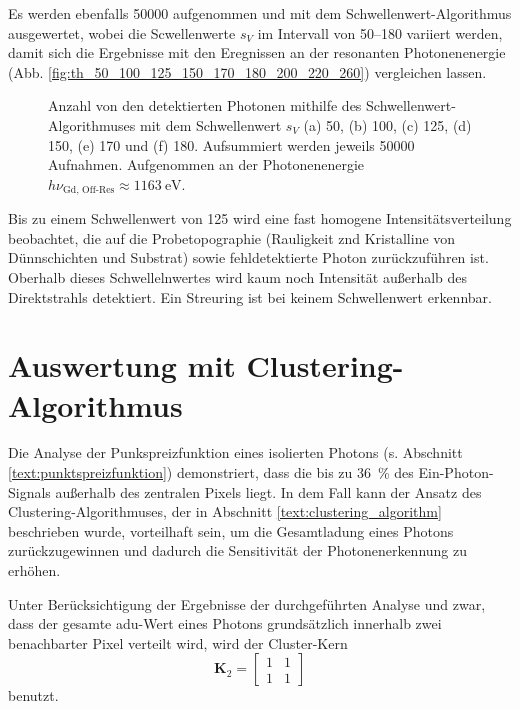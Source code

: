 \noindent
Es werden ebenfalls \SI{50000}{\captures} aufgenommen und mit dem Schwellenwert-Algorithmus ausgewertet, wobei die Scwellenwerte $s_V$ im Intervall von \SIrange{50}{180}{\adu} variiert werden, damit sich die Ergebnisse mit den Eregnissen an der resonanten Photonenenergie (Abb. \ref{fig:th_50_100_125_150_170_180_200_220_260}) vergleichen lassen.
\begin{figure}[H]
    \centering
    
    \caption{Anzahl von den detektierten Photonen mithilfe des Schwellenwert-Algorithmuses mit dem Schwellenwert $s_V$ (a) \SI{50}{\adu}, (b) \SI{100}{\adu}, (c) \SI{125}{\adu}, (d) \SI{150}{\adu}, (e) \SI{170}{\adu} und (f) \SI{180}{\adu}. Aufsummiert werden jeweils \num{50000} Aufnahmen. Aufgenommen an der Photonenenergie $h\nu_\text{Gd, Off-Res} \approx \SI{1163}{\eV}$.}
    \label{fig:th_50_100_125_150_170_180_off_resonance}
\end{figure}
\noindent
Bis zu einem Schwellenwert von \SI{125}{\adu} wird eine fast homogene Intensitätsverteilung beobachtet, die auf die Probetopographie (Rauligkeit znd Kristalline von Dünnschichten und Substrat) sowie fehldetektierte Photon zurückzuführen ist. Oberhalb dieses Schwellelnwertes wird kaum noch Intensität außerhalb des Direktstrahls detektiert. Ein Streuring ist bei keinem Schwellenwert erkennbar.

\section{Auswertung mit Clustering-Algorithmus}
Die Analyse der Punkspreizfunktion eines isolierten Photons (s. Abschnitt \ref{text:punktspreizfunktion}) demonstriert, dass die bis zu \SI{36}{\percent} des Ein-Photon-Signals außerhalb des zentralen Pixels liegt. In dem Fall kann der Ansatz des Clustering-Algorithmuses, der in Abschnitt \ref{text:clustering_algorithm} beschrieben wurde, vorteilhaft sein, um die Gesamtladung eines Photons zurückzugewinnen und dadurch die Sensitivität der Photonenerkennung zu erhöhen.

\noindent
Unter Berücksichtigung der Ergebnisse der durchgeführten Analyse und zwar, dass der gesamte \gls{adu}-Wert eines Photons grundsätzlich innerhalb zwei benachbarter Pixel verteilt wird, wird der Cluster-Kern
\begin{equation}
    \mathbf{K}_2 = \begin{bmatrix}
1 & 1\\
1 & 1
\end{bmatrix}
\end{equation}
benutzt.

